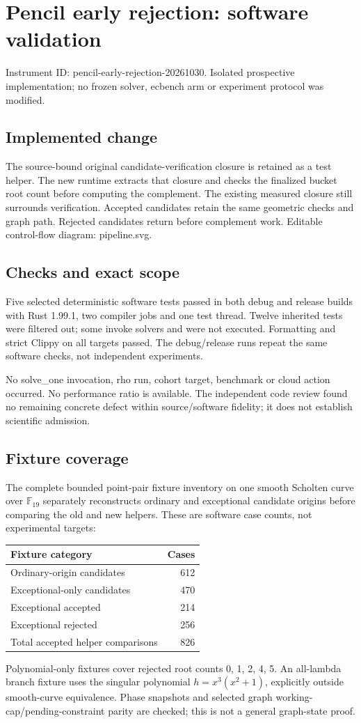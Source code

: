 \documentclass[11pt]{article}
\begin{document}
\section*{Pencil early rejection: software validation}
Instrument ID: pencil-early-rejection-20261030. Isolated prospective implementation; no frozen solver, ecbench arm or experiment protocol was modified.
\subsection*{Implemented change}
The source-bound original candidate-verification closure is retained as a test helper. The new runtime extracts that closure and checks the finalized bucket root count before computing the complement. The existing measured closure still surrounds verification. Accepted candidates retain the same geometric checks and graph path. Rejected candidates return before complement work. Editable control-flow diagram: pipeline.svg.
\subsection*{Checks and exact scope}
Five selected deterministic software tests passed in both debug and release builds with Rust 1.99.1, two compiler jobs and one test thread. Twelve inherited tests were filtered out; some invoke solvers and were not executed. Formatting and strict Clippy on all targets passed. The debug/release runs repeat the same software checks, not independent experiments.\par
No solve\_one invocation, rho run, cohort target, benchmark or cloud action occurred. No performance ratio is available. The independent code review found no remaining concrete defect within source/software fidelity; it does not establish scientific admission.
\subsection*{Fixture coverage}
The complete bounded point-pair fixture inventory on one smooth Scholten curve over $\mathbb F_{19}$ separately reconstructs ordinary and exceptional candidate origins before comparing the old and new helpers. These are software case counts, not experimental targets:
\begin{center}\begin{tabular}{lr}\toprule
Fixture category&Cases\\\midrule
Ordinary-origin candidates&612\\
Exceptional-only candidates&470\\
Exceptional accepted&214\\
Exceptional rejected&256\\
Total accepted helper comparisons&826\\\bottomrule\end{tabular}\end{center}
Polynomial-only fixtures cover rejected root counts 0, 1, 2, 4, 5. An all-lambda branch fixture uses the singular polynomial $h=x^3(x^2+1)$, explicitly outside smooth-curve equivalence. Phase snapshots and selected graph working-cap/pending-constraint parity are checked; this is not a general graph-state proof.
\end{document}
